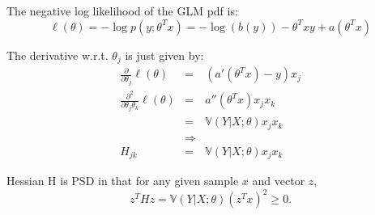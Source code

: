 \begin{answer}

The negative log likelihood of the GLM pdf is:
\begin{equation*}
    \ell(\theta) = -\log p(y; \theta^T x) = -\log(b(y)) - \theta^T x y + a(\theta^T x)
\end{equation*}

The derivative w.r.t. $\theta_j$ is just given by:
\begin{eqnarray*}
\frac{\partial}{\partial \theta_j}\ell(\theta) 
    &=& (a'(\theta^T x) - y) x_j \\
\frac{\partial^2}{\partial \theta_j \theta_k}\ell(\theta) 
    &=& a''(\theta^T x) x_j x_k \\
    &=& \mathbb{V}(Y|X;\theta) x_j x_k \\
    &\Rightarrow&   \\
H_{jk}
    &=& \mathbb{V}(Y|X;\theta) x_j x_k
\end{eqnarray*}

Hessian H is PSD in that for any given sample $x$ and vector $z$, 
\begin{equation*}
    z^T H z = \mathbb{V}(Y|X;\theta) (z^T x)^2 \ge 0.
\end{equation*}

\end{answer}
